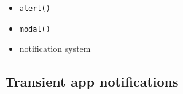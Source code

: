 \begin{itemize}
  \begin{itemize}
  \tightlist
  \item
    \texttt{a\allowbreak{}l\allowbreak{}e\allowbreak{}r\allowbreak{}t\allowbreak{}(\allowbreak{})}
  \item
    \texttt{m\allowbreak{}o\allowbreak{}d\allowbreak{}a\allowbreak{}l\allowbreak{}(\allowbreak{})}
  \item
    notification system
  \end{itemize}
\end{itemize}

\subsection{Transient app notifications}\label{record-019-transient-app-notifications}

